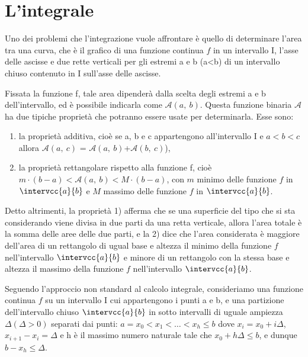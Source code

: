 ﻿%

\chapter{L'integrale}

Uno dei problemi che l'integrazione vuole affrontare è quello di determinare 
l'area tra una curva, che è il grafico di una funzione continua \(f\) in un 
intervallo I, l'asse delle ascisse e due rette verticali per gli estremi a e 
b (a<b) di un intervallo chiuso contenuto in I sull'asse delle ascisse.

Fissata la funzione f, tale area dipenderà dalla scelta degli estremi a e b 
dell'intervallo, ed è possibile indicarla come \(\mathcal{A}(a,~b)\). Questa 
funzione 
binaria \(\mathcal{A}\) ha due tipiche proprietà che potranno essere 
usate per determinarla. Esse sono: 

\begin{enumerate}
 \item 
la proprietà additiva, cioè se a, b e c 
appartengono all'intervallo I e 
\(a < b < c\)
allora \(\mathcal{A}(a,~c)\) = 
\(\mathcal{A}(a,~b)\)+\(\mathcal{A}(b,~c)\)),
 \item 
la proprietà rettangolare rispetto alla funzione f, 
cioè \(m\cdot(b-a) < \mathcal{A}(a,~b)< M\cdot(b-a)\), 
con \(m\) minimo delle funzione \(f\) in \(\intervcc{a}{b}\) e \(M\) massimo 
delle funzione \(f\) in \(\intervcc{a}{b}\).
\end{enumerate}
 
Detto altrimenti, la proprietà 1) afferma che se una superficie 
del tipo che si sta considerando viene divisa in due parti da una retta 
verticale, allora l'area totale è la somma delle aree delle due parti, e la 
2) dice che l'area considerata è maggiore dell'area di un rettangolo di ugual 
base e altezza il minimo della funzione \(f\) nell'intervallo 
\(\intervcc{a}{b}\) 
e minore di 
un rettangolo con la stessa base e altezza il massimo della funzione \(f\) 
nell'intervallo \(\intervcc{a}{b}\).

Seguendo l'approccio non standard al calcolo integrale, consideriamo una 
funzione continua \(f\) su un intervallo I cui appartengono i punti a e b, e 
una 
partizione dell'intervallo chiuso \(\intervcc{a}{b}\) in sotto intervalli di 
uguale 
ampiezza \(\Delta (\Delta>0)\) 
separati dai punti: \(a = x_0 < x_1 < … < x_h \le b\) 
dove \(x_i = x_0 +i \Delta\), \(x_{i+1} - x_i= \Delta\) e h è il massimo  
numero naturale tale che 
\(x_0 + h \Delta \le b\), e dunque \(b-x_h \le \Delta\).

